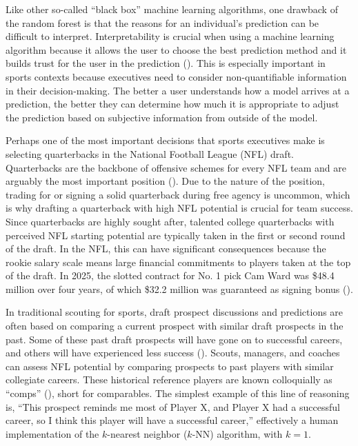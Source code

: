 \documentclass[Review, sageh, times]{sagej}
\begin{document}
Like other so-called ``black box'' machine learning algorithms, one drawback of the random forest is that the reasons for an individual's prediction can be difficult to interpret. Interpretability is crucial when using a machine learning algorithm because it allows the user to choose the best prediction method and it builds trust for the user in the prediction (\cite{ribeiro_why_2016}). This is especially important in sports contexts because executives need to consider non-quantifiable information in their decision-making. The better a user understands how a model arrives at a prediction, the better they can determine how much it is appropriate to adjust the prediction based on subjective information from outside of the model.

Perhaps one of the most important decisions that sports executives make is selecting quarterbacks in the National Football League (NFL) draft. Quarterbacks are the backbone of offensive schemes for every NFL team and are arguably the most important position (\cite{hughes_positional_2015}). Due to the nature of the position, trading for or signing a solid quarterback during free agency is uncommon, which is why drafting a quarterback with high NFL potential is crucial for team success. Since quarterbacks are highly sought after, talented college quarterbacks with perceived NFL starting potential are typically taken in the first or second round of the draft. In the NFL, this can have significant consequences because the rookie salary scale means large financial commitments to players taken at the top of the draft. In 2025, the slotted contract for No. 1 pick Cam Ward was \$48.4 million over four years, of which \$32.2 million was guaranteed as signing bonus (\cite{badenhausen_nfl_2025}).

In traditional scouting for sports, draft prospect discussions and predictions are often based on comparing a current prospect with similar draft prospects in the past. Some of these past draft prospects will have gone on to successful careers, and others will have experienced less success (\cite{trapasso_nfl_2025}). Scouts, managers, and coaches can assess NFL potential by comparing prospects to past players with similar collegiate careers. These historical reference players are known colloquially as ``comps'' (\cite{jones_nfl_2025}), short for comparables. The simplest example of this line of reasoning is, ``This prospect reminds me most of Player X, and Player X had a successful career, so I think this player will have a successful career,'' effectively a human implementation of the $k$-nearest neighbor ($k$-NN) algorithm, with $k = 1$.
\end{document}
